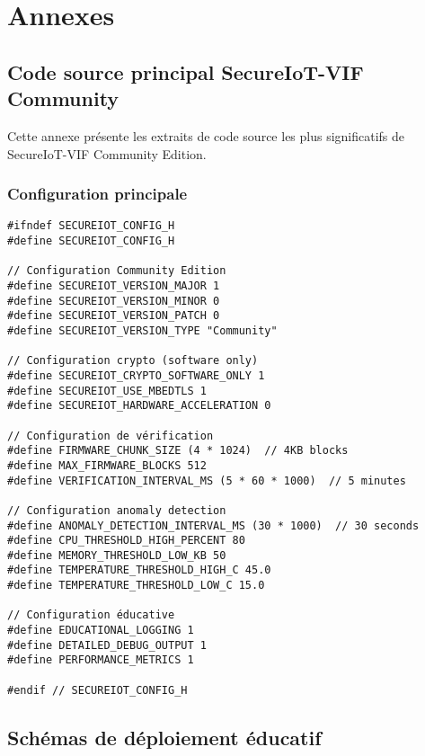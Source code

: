 
\chapter{Annexes}
\label{chap:appendices}

\section{Code source principal SecureIoT-VIF Community}
\label{app:source-code}

Cette annexe présente les extraits de code source les plus significatifs de SecureIoT-VIF Community Edition.

\subsection{Configuration principale}

\lstset{language=C}
\begin{lstlisting}[caption={Fichier de configuration secureiot\_config.h}]
#ifndef SECUREIOT_CONFIG_H
#define SECUREIOT_CONFIG_H

// Configuration Community Edition
#define SECUREIOT_VERSION_MAJOR 1
#define SECUREIOT_VERSION_MINOR 0
#define SECUREIOT_VERSION_PATCH 0
#define SECUREIOT_VERSION_TYPE "Community"

// Configuration crypto (software only)
#define SECUREIOT_CRYPTO_SOFTWARE_ONLY 1
#define SECUREIOT_USE_MBEDTLS 1
#define SECUREIOT_HARDWARE_ACCELERATION 0

// Configuration de vérification
#define FIRMWARE_CHUNK_SIZE (4 * 1024)  // 4KB blocks
#define MAX_FIRMWARE_BLOCKS 512
#define VERIFICATION_INTERVAL_MS (5 * 60 * 1000)  // 5 minutes

// Configuration anomaly detection
#define ANOMALY_DETECTION_INTERVAL_MS (30 * 1000)  // 30 seconds
#define CPU_THRESHOLD_HIGH_PERCENT 80
#define MEMORY_THRESHOLD_LOW_KB 50
#define TEMPERATURE_THRESHOLD_HIGH_C 45.0
#define TEMPERATURE_THRESHOLD_LOW_C 15.0

// Configuration éducative
#define EDUCATIONAL_LOGGING 1
#define DETAILED_DEBUG_OUTPUT 1
#define PERFORMANCE_METRICS 1

#endif // SECUREIOT_CONFIG_H
\end{lstlisting}

\section{Schémas de déploiement éducatif}
\label{app:deployment}

